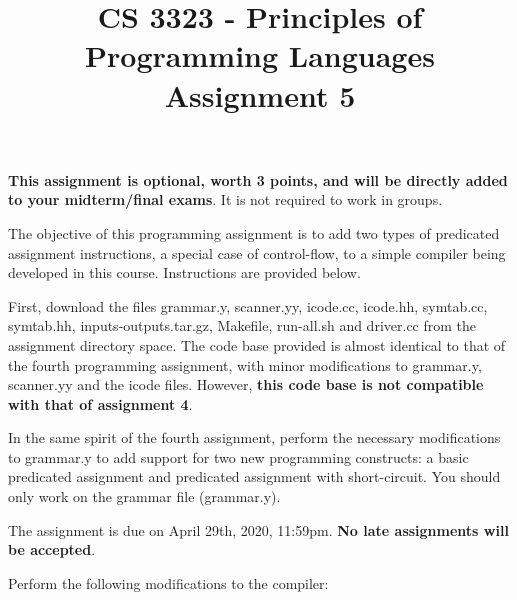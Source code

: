 \documentclass[letter,10pt]{article}
\title{CS 3323 - Principles of Programming Languages\\ Assignment 5}
\date{}
\begin{document}
\maketitle

{\bf This assignment is optional, worth 3 points, and will be directly added
to your midterm/final exams}. It is not required to work in groups.

The objective of this programming assignment is to add two types of predicated 
assignment instructions, a special case of control-flow,
to a simple compiler being developed in this course. Instructions are provided below.

First, download the files 
grammar.y, scanner.yy, icode.cc, icode.hh, symtab.cc, symtab.hh, inputs-outputs.tar.gz, Makefile, run-all.sh and driver.cc 
from the assignment directory space. 
The code base provided is almost identical to that of the fourth programming assignment, with minor
modifications to grammar.y, scanner.yy and the icode files. However, {\bf this code base is not compatible
with that of assignment 4}.

In the same spirit of the fourth assignment, perform the necessary modifications
to grammar.y to add support for two new programming constructs: a basic predicated assignment and predicated assignment with short-circuit.
You should only work on the grammar file (grammar.y).

The assignment is due on April 29th, 2020, 11:59pm. {\bf No late assignments will be accepted}.

Perform the following modifications to the compiler:
\end{document}
